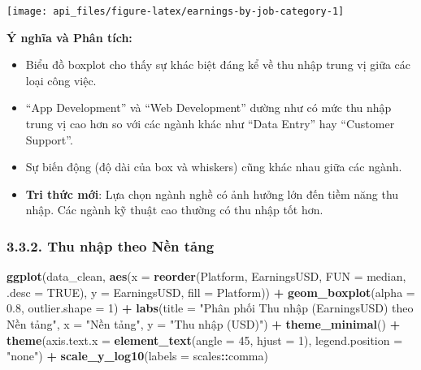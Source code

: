 \documentclass[
]{article}
\newenvironment{Shaded}{\begin{snugshade}}{\end{snugshade}}
\newcommand{\AttributeTok}[1]{\textcolor[rgb]{0.13,0.29,0.53}{#1}}
\newcommand{\ConstantTok}[1]{\textcolor[rgb]{0.56,0.35,0.01}{#1}}
\newcommand{\DecValTok}[1]{\textcolor[rgb]{0.00,0.00,0.81}{#1}}
\newcommand{\FloatTok}[1]{\textcolor[rgb]{0.00,0.00,0.81}{#1}}
\newcommand{\FunctionTok}[1]{\textcolor[rgb]{0.13,0.29,0.53}{\textbf{#1}}}
\newcommand{\NormalTok}[1]{#1}
\newcommand{\SpecialCharTok}[1]{\textcolor[rgb]{0.81,0.36,0.00}{\textbf{#1}}}
\newcommand{\StringTok}[1]{\textcolor[rgb]{0.31,0.60,0.02}{#1}}
\begin{document}
\begin{center}\texttt{[image: api\_files/figure-latex/earnings-by-job-category-1]} \end{center}

\textbf{Ý nghĩa và Phân tích:}

\begin{itemize}
\item
  Biểu đồ boxplot cho thấy sự khác biệt đáng kể về thu nhập trung vị
  giữa các loại công việc.
\item
  ``App Development'' và ``Web Development'' dường như có mức thu nhập
  trung vị cao hơn so với các ngành khác như ``Data Entry'' hay
  ``Customer Support''.
\item
  Sự biến động (độ dài của box và whiskers) cũng khác nhau giữa các
  ngành.
\item
  \textbf{Tri thức mới}: Lựa chọn ngành nghề có ảnh hưởng lớn đến tiềm
  năng thu nhập. Các ngành kỹ thuật cao thường có thu nhập tốt hơn.
\end{itemize}

\subsubsection{3.3.2. Thu nhập theo Nền
tảng}\label{thu-nhux1eadp-theo-nux1ec1n-tux1ea3ng}

\begin{Shaded}
\begin{Highlighting}[]
\FunctionTok{ggplot}\NormalTok{(data\_clean, }\FunctionTok{aes}\NormalTok{(}\AttributeTok{x =} \FunctionTok{reorder}\NormalTok{(Platform, EarningsUSD, }\AttributeTok{FUN =}\NormalTok{ median, }\AttributeTok{.desc =} \ConstantTok{TRUE}\NormalTok{), }\AttributeTok{y =}\NormalTok{ EarningsUSD, }\AttributeTok{fill =}\NormalTok{ Platform)) }\SpecialCharTok{+}
  \FunctionTok{geom\_boxplot}\NormalTok{(}\AttributeTok{alpha =} \FloatTok{0.8}\NormalTok{, }\AttributeTok{outlier.shape =} \DecValTok{1}\NormalTok{) }\SpecialCharTok{+}
  \FunctionTok{labs}\NormalTok{(}\AttributeTok{title =} \StringTok{"Phân phối Thu nhập (EarningsUSD) theo Nền tảng"}\NormalTok{,}
       \AttributeTok{x =} \StringTok{"Nền tảng"}\NormalTok{,}
       \AttributeTok{y =} \StringTok{"Thu nhập (USD)"}\NormalTok{) }\SpecialCharTok{+}
  \FunctionTok{theme\_minimal}\NormalTok{() }\SpecialCharTok{+}
  \FunctionTok{theme}\NormalTok{(}\AttributeTok{axis.text.x =} \FunctionTok{element\_text}\NormalTok{(}\AttributeTok{angle =} \DecValTok{45}\NormalTok{, }\AttributeTok{hjust =} \DecValTok{1}\NormalTok{), }\AttributeTok{legend.position =} \StringTok{"none"}\NormalTok{) }\SpecialCharTok{+}
  \FunctionTok{scale\_y\_log10}\NormalTok{(}\AttributeTok{labels =}\NormalTok{ scales}\SpecialCharTok{::}\NormalTok{comma)}
\end{Highlighting}
\end{Shaded}
\end{document}
